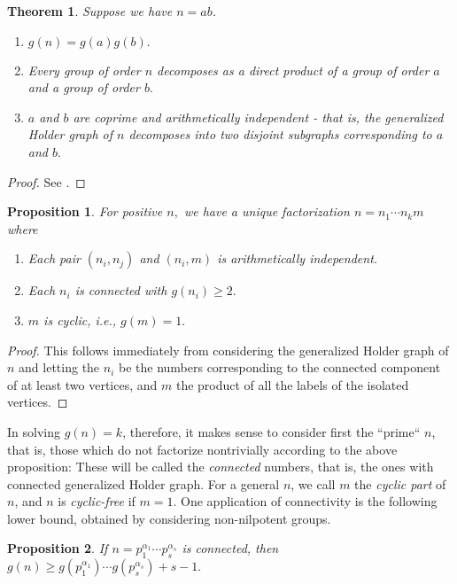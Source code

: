 \documentclass[draft]{article}
\newcommand{\ufdsh}{p_1^{\alpha_1} \cdots p_s^{\alpha_s}}
\theoremstyle{plain}
\newtheorem{thm}{Theorem}[section]
\newtheorem{prop}{Proposition}[section]
\theoremstyle{definition}
\begin{document}
\begin{thm}
	Suppose we have $n = ab$.
	\begin{enumerate}\listspace
		\item $g(n) = g(a)g(b).$
		\item Every group of order $n$ decomposes as a direct product of a group of order $a$ and a group of order $b.$
		\item $a$ and $b$ are coprime and arithmetically independent - that is, the generalized Holder graph of $n$ decomposes into two disjoint subgraphs corresponding to $a$ and $b.$
	\end{enumerate} \textspace
\end{thm}
\begin{proof}
	See {\cite{monolith}}.
\end{proof}

\begin{prop}
	For positive $n,$ we have a unique factorization $n = n_1 \cdots n_k m$ where\pagebreak[3]
	\begin{enumerate} \listspace
		\item Each pair $(n_i, n_j)$ and $(n_i, m)$ is arithmetically independent.
		\item Each $n_i$ is connected with $g(n_i) \ge 2.$
		\item $m$ is cyclic, i.e., $g(m) = 1.$
	\end{enumerate} \textspace
\end{prop}
\begin{proof}
	This follows immediately from considering the generalized Holder graph of $n$ and letting the $n_i$ be the numbers corresponding to the connected component of at least two vertices, and $m$ the product of all the labels of the isolated vertices.
\end{proof}

In solving $g(n) = k$, therefore, it makes sense to consider first the ``prime`` $n$, that is, those which do not factorize nontrivially according to the above proposition: These will be called the \emph{connected} numbers, that is, the ones with connected generalized Holder graph. For a general $n$, we call $m$ the \emph{cyclic part} of $n$, and $n$ is \emph{cyclic-free} if $m = 1$. One application of connectivity is the following lower bound, obtained by considering non-nilpotent groups.

\begin{prop}
	If $n = \ufdsh$ is connected, then $g(n) \ge g(p_1^{\alpha_1})\cdots g(p_s^{\alpha_s}) + s - 1.$
\end{prop}
\end{document}
